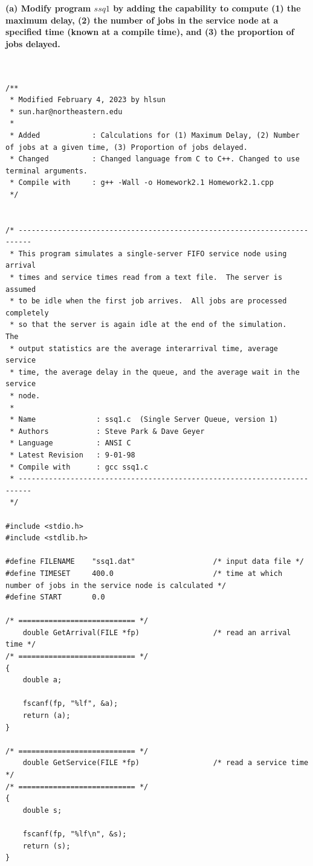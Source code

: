 \textbf{(a) Modify program $ssq1$ by adding the capability to compute (1) the maximum
delay, (2) the number of jobs in the service node at a specified time (known at a compile time), and (3) the proportion of jobs delayed.\\\\}

\begin{lstlisting}[style=CStyle]

/**
 * Modified February 4, 2023 by hlsun
 * sun.har@northeastern.edu
 * 
 * Added            : Calculations for (1) Maximum Delay, (2) Number of jobs at a given time, (3) Proportion of jobs delayed.
 * Changed          : Changed language from C to C++. Changed to use terminal arguments.
 * Compile with     : g++ -Wall -o Homework2.1 Homework2.1.cpp
 */


/* -------------------------------------------------------------------------
 * This program simulates a single-server FIFO service node using arrival
 * times and service times read from a text file.  The server is assumed
 * to be idle when the first job arrives.  All jobs are processed completely
 * so that the server is again idle at the end of the simulation.   The
 * output statistics are the average interarrival time, average service
 * time, the average delay in the queue, and the average wait in the service 
 * node. 
 *
 * Name              : ssq1.c  (Single Server Queue, version 1)
 * Authors           : Steve Park & Dave Geyer
 * Language          : ANSI C
 * Latest Revision   : 9-01-98
 * Compile with      : gcc ssq1.c 
 * ------------------------------------------------------------------------- 
 */

#include <stdio.h>   
#include <stdlib.h> 

#define FILENAME    "ssq1.dat"                  /* input data file */
#define TIMESET     400.0                       /* time at which number of jobs in the service node is calculated */
#define START       0.0

/* =========================== */
    double GetArrival(FILE *fp)                 /* read an arrival time */
/* =========================== */
{ 
    double a;

    fscanf(fp, "%lf", &a);
    return (a);
}

/* =========================== */
    double GetService(FILE *fp)                 /* read a service time */
/* =========================== */
{ 
    double s;

    fscanf(fp, "%lf\n", &s);
    return (s);
}


\end{lstlisting}
